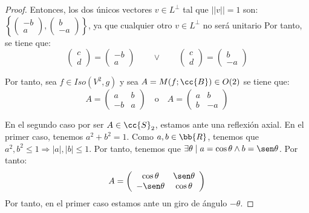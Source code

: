 \begin{proof}
        Entonces, los dos únicos vectores $v\in L^\perp$ tal que $||v||=1$ son: $\left\{\left(\begin{array}{c}
            -b \\ a
        \end{array}\right),
        \left(\begin{array}{c}
            b \\ -a
        \end{array}\right)\right\}$, ya que cualquier otro $v\in L^\perp$ no será unitario
        Por tanto, se tiene que:
        \begin{equation*}
            \left(\begin{array}{c}
            c \\ d
        \end{array}\right) =
        \left(\begin{array}{c}
            -b \\ a
        \end{array}\right)
        \qquad \lor \qquad
        \left(\begin{array}{c}
            c \\ d
        \end{array}\right) =\left(\begin{array}{c}
            b \\ -a
        \end{array}\right)
        \end{equation*}

    Por tanto, sea $f\in Iso(V^2, g)$ y sea $A=M(f;\cc{B})\in O(2)$ se tiene que:
    \begin{equation*}
        A = \left(\begin{array}{cc}
            a & b \\
            -b & a
        \end{array}\right)
        \quad \text{o} \quad
        A = \left(\begin{array}{cc}
            a & b \\
            b & -a
        \end{array}\right)
    \end{equation*}

    En el segundo caso por ser $A\in \cc{S}_2$, estamos ante una reflexión axial. En el primer caso, tenemos $a^2+b^2=1$. Como $a,b\in \bb{R}$, tenemos que $a^2,b^2\leq 1 \Longrightarrow |a|,|b|\leq 1$. Por tanto, tenemos que $\exists \theta \mid a=\cos \theta \land b=\sen \theta$. Por tanto:
    \begin{equation*}
        A=\left(\begin{array}{cc}
                \cos \theta & \sen \theta \\
                -\sen \theta & \cos \theta
            \end{array}\right)
    \end{equation*}
    Por tanto, en el primer caso estamos ante un giro de ángulo $-\theta$.
\end{proof}

